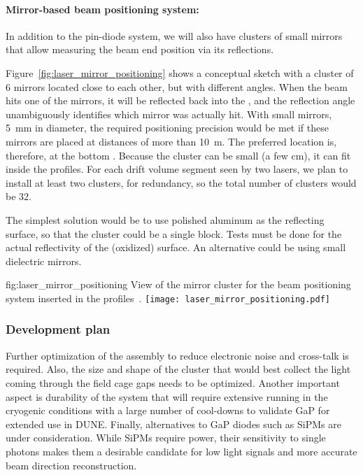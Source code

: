 \paragraph{Mirror-based beam positioning system:}

In addition to the pin-diode system, we will also have clusters of small mirrors that allow measuring the beam end position via its reflections.

Figure~\ref{fig:laser_mirror_positioning} shows a conceptual sketch with a cluster of 6 mirrors located close to each other, but with different angles. When the beam hits one of the mirrors, it will be reflected back into the , and the reflection angle unambiguously identifies which mirror was actually hit. With small mirrors, \SI{5}{\milli\m} in diameter, the required positioning precision would be met if these mirrors are placed at distances of more than \SI{10}{\m}. The preferred location is, therefore, at the bottom . Because the cluster can be small (a few cm), it can fit inside the  profiles. For each drift volume segment seen by two lasers, we plan to install at least two clusters, for redundancy, so the total number of clusters would be \num{32}. 

The simplest solution would be to use polished aluminum as the reflecting surface, so that the cluster could be a single block. Tests must be done for the actual reflectivity of the (oxidized) surface. An alternative could be using small dielectric mirrors.

\begin{dunefigure}{fig:laser_mirror_positioning}
{View of the mirror cluster for the beam positioning system inserted in the  profiles~\cite{bib:yu2019a}.}
\texttt{[image: laser\_mirror\_positioning.pdf]}
\end{dunefigure}


\subsubsection{Development plan}
 Further optimization of the  assembly to reduce electronic noise and cross-talk is required. Also, the size and shape of the cluster that would best collect the light coming through the field cage gaps needs to be optimized.  Another important aspect is durability of the system that will require extensive running in the cryogenic conditions with  a large number of cool-downs to validate GaP for extended use in DUNE. Finally, alternatives to GaP diodes such as SiPMs are under consideration. While SiPMs require power, their sensitivity to single photons makes them a desirable candidate for low light signals and more accurate beam direction reconstruction. 
















